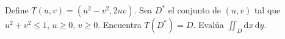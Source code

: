 Define \(T(u,v) = (u^2 - v^2, 2uv)\). Sea \(D^*\) el conjunto de \((u,v)\) tal que \(u^2 + v^2 \leq 1\), \(u \geq 0\), \(v \geq 0\). Encuentra \(T(D^*) = D\). Evalúa \(\iint_D \mathrm{d}x \, \mathrm{d}y\).
